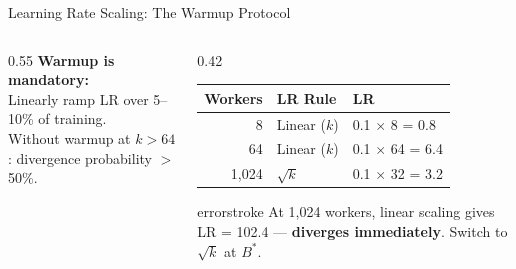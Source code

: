 \documentclass[aspectratio=169, 12pt]{beamer}
\begin{document}
\begin{frame}{Learning Rate Scaling: The Warmup Protocol}
\begin{columns}[T]
\begin{column}{0.55\textwidth}
    \vspace{0.15cm}
    \textbf{Warmup is mandatory:}\\
    {\footnotesize Linearly ramp LR over 5--10\% of training.\\
    Without warmup at $k > 64$: divergence probability $>$50\%.}
  \end{column}
  \begin{column}{0.42\textwidth}
    \vspace{0.1cm}
    \renewcommand{\arraystretch}{1.15}
    {\footnotesize
    \begin{tabular}{@{}rll@{}}
      \toprule
      \textbf{Workers} & \textbf{LR Rule} & \textbf{LR} \\
      \midrule
      8   & Linear ($k$)    & 0.1 $\times$ 8 = 0.8 \\
      64  & Linear ($k$)    & 0.1 $\times$ 64 = 6.4 \\
      1,024 & $\sqrt{k}$ & 0.1 $\times$ 32 = 3.2 \\
      \bottomrule
    \end{tabular}
    }

    \vspace{0.1cm}
    \begin{mlsyscard}{errorstroke}
    {\scriptsize At 1,024 workers, linear scaling gives LR = 102.4 --- \textbf{diverges immediately}. Switch to $\sqrt{k}$ at $B^*$.}
    \end{mlsyscard}
  \end{column}
\end{columns}

\end{frame}
\end{document}
